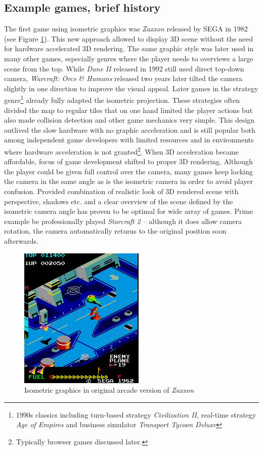 \documentclass[11pt,oneside, final]{fithesis2}
\begin{document}
\subsection{Example games, brief history}
The first game using isometric graphics was \emph{Zaxxon} released by SEGA in 1982\cite{zaxxon} (see Figure \ref{zaxxon}). This new approach allowed to display 3D scene without the need for hardware accelerated 3D rendering. The same graphic style was later used in many other games, especially genres where the player needs to overviews a large scene from the top. While \emph{Dune II} released in 1992\cite{dune2} still used direct top-down camera, \emph{Warcraft: Orcs \& Humans} released two years later\cite{blizzardlegacy} tilted the camera slightly in one direction to improve the visual appeal. Later games in the strategy genre\footnote{1990s classics including turn-based strategy \emph{Civilization II}\cite{civ2}, real-time strategy \emph{Age of Empires}\cite{ageofempires} and business simulator \emph{Transport Tycoon Deluxe}\cite{ttd}} already fully adapted the isometric projection. These strategies often divided the map to regular tiles that on one hand limited the player actions but also made collision detection and other game mechanics very simple. This design outlived the slow hardware with no graphic acceleration and is still popular both among independent game developers with limited resources and in environments where hardware acceleration is not granted\footnote{Typically browser games discussed later.}. When 3D acceleration became affordable, focus of game development shifted to proper 3D rendering. Although the player could be given full control over the camera, many games keep locking the camera in the same angle as is the isometric camera in order to avoid player confusion. Provided combination of realistic look of 3D rendered scene with perspective, shadows etc. and a clear overview of the scene defined by the isometric camera angle has proven to be optimal for wide array of games. Prime example be professionally played \emph{Starcraft 2}\cite{sc2} -- although it does allow camera rotation, the camera automatically returns to the original position soon afterwards.

\begin{figure}[h]
	\centering
	\includegraphics{zaxxon}
	\caption{Isometric graphics in original arcade version of \emph{Zaxxon}\cite{zaxxon}}
	\label{zaxxon}
\end{figure}
\end{document}
